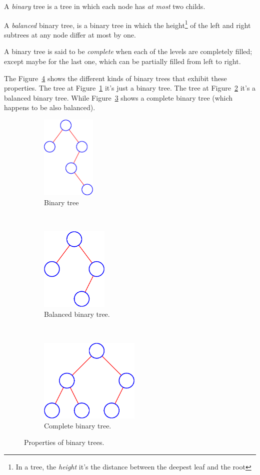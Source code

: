 A \emph{binary} tree is a tree in which each node has \emph{at most} two childs.

A \emph{balanced} binary tree, is a binary tree in which the height\footnote{In a tree, the \emph{height} it's the distance between the deepest leaf and the root} of the left and right subtrees at any node differ at most by one.

A binary tree is said to be \emph{complete} when each of the levels are completely filled; except maybe for the last one, which can be partially filled from left to right.

The Figure~\ref{fig:tree} shows the different kinds of binary trees that exhibit these properties.
The tree at Figure~\ref{fig:bintree} it's just a binary tree.
The tree at Figure~\ref{fig:balancetree} it's a balanced binary tree.
While Figure~\ref{fig:completetree} shows a complete binary tree (which happens to be also balanced).

\begin{figure}[htp]
 \centering
 \begin{subfigure}[b]{0.3\textwidth}
   \includegraphics[height=4cm]{img/binTree}
   \caption{Binary tree}
 \label{fig:bintree}
 \end{subfigure}
~
 \begin{subfigure}[b]{0.3\textwidth}
   \includegraphics[height=4cm]{img/balanceTree}
   \caption{Balanced binary tree.}
   \label{fig:balancetree}
 \end{subfigure}
~
 \begin{subfigure}[b]{0.3\textwidth}
   \includegraphics[height=4cm]{img/completeTree}
   \caption{Complete binary tree.}
   \label{fig:completetree}
 \end{subfigure}
  \caption{Properties of binary trees.}
  \label{fig:tree}
\end{figure}

